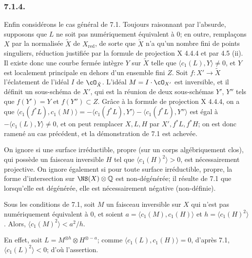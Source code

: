 \subsubsection*{7.1.4.}
Enfin consid\'erons le cas g\'en\'eral de 7.1. Toujours raisonnant par l'absurde, supposons que $L$ ne soit pas num\'eriquement \'equivalent \`a $0$; en outre, rempla\c{c}ons $X$ par la normalis\'ee $\tilde{X}$ de $X_{\mathrm{red}}$, de sorte que $\tilde{X}$ n'a qu'un nombre fini de points singuliers, r\'eduction justifi\'ee par la formule de projection X 4.4.4 et par 4.5 (ii). Il existe donc une courbe ferm\'ee int\`egre $Y$ sur $\tilde{X}$ telle que $\langle c_1(L), Y \rangle \neq 0$, et $Y$ est localement principale en dehors d'un ensemble fini $Z$. Soit $f : X' \to \tilde{X}$ l'\'eclatement de l'id\'eal $I$ de $\cO_{\tilde{X}}$. L'id\'eal $M = I \cdot \cO_{X'}$ est inversible, et il d\'efinit un sous-sch\'ema de $X'$, qui est la r\'eunion de deux sous-sch\'emas $Y'$, $Y''$ tels que $f(Y') = Y$ et $f(Y'') \subset Z$. Gr\^ace \`a la formule de projection X 4.4.4, on a que $\langle c_1(f^*L), c_1(M) \rangle = -\langle c_1(f^*L), Y' \rangle - \langle c_1(f^*L), Y'' \rangle$ est \'egal \`a $-\langle c_1(L), Y \rangle \neq 0$, et on peut remplacer $X, L, H$ par $X', f^*L, f^*H$; on est donc ramen\'e au cas pr\'ec\'edent, et la d\'emonstration de 7.1 est achev\'ee.

\begin{remarque}[7.2]
On ignore si une surface irr\'eductible, propre (sur un corps alg\'ebriquement clos), qui poss\`ede un faisceau inversible $H$ tel que $\langle c_1(H)^2 \rangle > 0$, est n\'ecessairement projective. On ignore \'egalement si pour toute surface irr\'eductible, propre, la forme d'intersection sur $\NS(X) \otimes \mathbb{Q}$ est non-d\'eg\'en\'er\'ee; il r\'esulte de 7.1 que lorsqu'elle est d\'eg\'en\'er\'ee, elle est n\'ecessairement n\'egative (non-d\'efinie).
\end{remarque}

\begin{corollaire}[7.3]
Sous les conditions de 7.1, soit $M$ un faisceau inversible sur $X$ qui n'est pas num\'eriquement \'equivalent \`a $0$, et soient $a = \langle c_1(M), c_1(H) \rangle$ et $h = \langle c_1(H)^2 \rangle$. Alors, $\langle c_1(M)^2 \rangle < a^2/h$.
\end{corollaire}

En effet, soit $L = M^{\otimes h} \otimes H^{\otimes -a}$; comme $\langle c_1(L), c_1(H) \rangle = 0$, d'apr\`es 7.1, $\langle c_1(L)^2 \rangle < 0$; d'o\`u l'assertion.

